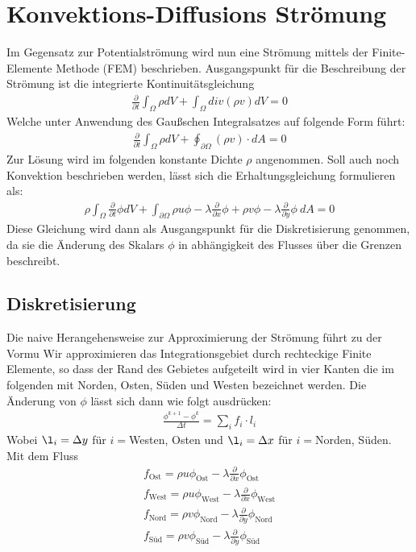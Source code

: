 \documentclass{article}
\newcommand{\ddt}{\frac{\partial }{\partial t}}
\newcommand{\ddx}{\frac{\partial }{\partial x}}
\newcommand{\ddy}{\frac{\partial }{\partial y}}
\begin{document}
\section{Konvektions-Diffusions Strömung}
Im Gegensatz zur Potentialströmung wird nun eine Strömung mittels der Finite-Elemente Methode (FEM) beschrieben. Ausgangspunkt
für die Beschreibung der Strömung ist die integrierte Kontinuitätsgleichung
\begin{align}
\ddt \int_{\Omega} \rho dV + \int_{\Omega} div(\rho v) dV = 0
\end{align}
Welche unter Anwendung des Gaußschen Integralsatzes auf folgende Form führt:
\begin{align}
\ddt \int_{\Omega} \rho dV + \oint_{\partial \Omega} (\rho v)\cdot dA = 0
\end{align}	
Zur Lösung wird im folgenden konstante Dichte $\rho$ angenommen. 
Soll auch noch Konvektion beschrieben werden, lässt sich die Erhaltungsgleichung formulieren als:
\begin{align}
\rho \int_{\Omega}\ddt \phi dV + \int_{\partial \Omega}\rho u \phi -\lambda \ddx \phi + \rho v \phi - \lambda \ddy \phi \ dA =0 
\end{align}
Diese Gleichung wird dann als Ausgangspunkt für die Diskretisierung genommen, 
da sie die Änderung des Skalars $\phi$ in abhängigkeit des Flusses über die Grenzen beschreibt.

\subsection{Diskretisierung}
Die naive Herangehensweise zur Approximierung der Strömung führt zu der Vormu
Wir approximieren das Integrationsgebiet durch rechteckige Finite Elemente, so dass der Rand des Gebietes aufgeteilt wird in vier Kanten
die im folgenden mit Norden, Osten, Süden und Westen bezeichnet werden. 
Die Änderung von $\phi$ lässt sich dann wie folgt ausdrücken:
\begin{align}
\frac{\phi^{k+1}-\phi^k}{\Delta t} = \sum_{i} f_i\cdot l_i
\end{align}
Wobei $\l_i = \Delta y$ für $i=$Westen, Osten und $\l_i = \Delta x$ für $i=$Norden, Süden.
Mit dem Fluss
\begin{align}
f_{\text{Ost}} = \rho u \phi_{\text{Ost}}- \lambda \ddx \phi_{\text{Ost}} \\
f_{\text{West}} = \rho u \phi_{\text{West}}- \lambda \ddx \phi_{\text{West}} \\
f_{\text{Nord}} = \rho v \phi_{\text{Nord}}- \lambda \ddy \phi_{\text{Nord}}\\
f_{\text{Süd}} = \rho v \phi_{\text{Süd}}- \lambda \ddy \phi_{\text{Süd}}
\end{align} 
\end{document}
